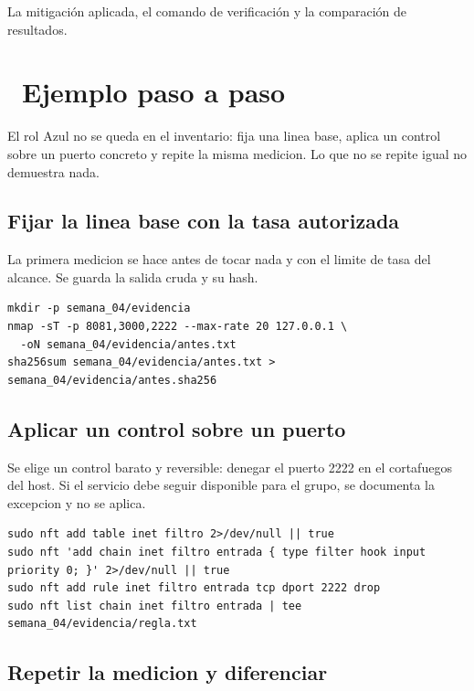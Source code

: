 \documentclass[11pt,a4paper]{article}
\newcommand{\iconotexto}[2]{\textcolor{cyanNeon}{\faIcon{#1}}~#2}
\begin{document}
La mitigación aplicada, el comando de verificación y la comparación de resultados.

\section{\iconotexto{list-ol}{Ejemplo paso a paso}}

El rol Azul no se queda en el inventario: fija una linea base, aplica un control sobre un puerto concreto y repite la misma medicion. Lo que no se repite igual no demuestra nada.

\subsection{Fijar la linea base con la tasa autorizada}

La primera medicion se hace antes de tocar nada y con el limite de tasa del alcance. Se guarda la salida cruda y su hash.

\begin{lstlisting}[style=estiloCodigo]
mkdir -p semana_04/evidencia
nmap -sT -p 8081,3000,2222 --max-rate 20 127.0.0.1 \
  -oN semana_04/evidencia/antes.txt
sha256sum semana_04/evidencia/antes.txt > semana_04/evidencia/antes.sha256
\end{lstlisting}

\subsection{Aplicar un control sobre un puerto}

Se elige un control barato y reversible: denegar el puerto 2222 en el cortafuegos del host. Si el servicio debe seguir disponible para el grupo, se documenta la excepcion y no se aplica.

\begin{lstlisting}[style=estiloCodigo]
sudo nft add table inet filtro 2>/dev/null || true
sudo nft 'add chain inet filtro entrada { type filter hook input priority 0; }' 2>/dev/null || true
sudo nft add rule inet filtro entrada tcp dport 2222 drop
sudo nft list chain inet filtro entrada | tee semana_04/evidencia/regla.txt
\end{lstlisting}

\subsection{Repetir la medicion y diferenciar}
\end{document}
